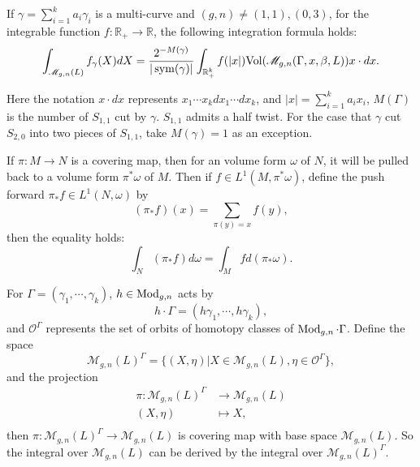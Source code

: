  
 \begin{theorem}\label{integrformu}
 If  $\gamma=\sum_{i=1}^ka_i\gamma_i$ is a multi-curve  and  $(g,n)\neq (1,1),(0,3)$,   for the integrable function $f:\mathbb{R}_+\to \mathbb{R}$, the following integration formula holds:
 $$
 \int_{\mathscr{M}_{g,n}(L)}f_\gamma(X)dX=\frac{2^{-M(\gamma)}}{|\operatorname{sym}(\gamma)|}\int_{\mathbb{R}_+^k}f(|x|)\mathrm{Vol}(\mathscr{M}_{g,n}(\Gamma,x,\beta,L))x\cdot dx.
 $$
 
 Here  the notation $x\cdot dx$ represents $x_1\cdots x_k dx_1\cdots dx_k$, and  $|x|=\sum_{i=1}^k a_ix_i$,
 $M(\Gamma)$  is the number of $S_{1,1}$ cut by $\gamma$. $S_{1,1}$ admits a half twist. For the case that $\gamma$ cut $S_{2,0}$ into two pieces of $S_{1,1}$, take $M(\gamma)=1$ as an exception.
 \end{theorem}
 
 
\begin{lemma}\label{coverintegral}
 If $\pi:M\to N$ is a covering map, then for an volume form $\omega$ of $N$, it will be pulled back to a volume form $\pi^*\omega$ of $M$. 
 Then if $f\in L^1(M,\pi^*\omega)$, define the push forward $\pi_*f\in L^1(N,\omega)$ by 
 \begin{equation}
      (\pi_*f)(x)=\sum_{\pi(y)=x}f(y),
 \end{equation}
 then the equality holds:
 \begin{equation}
     \int_{N} (\pi_*f)d\omega=\int_{M}fd(\pi_*\omega).
 \end{equation}
\end{lemma}
 
 
 For  $\Gamma=(\gamma_1,\cdots,\gamma_k)$,  $h\in \operatorname{Mod}_{g,n}$ acts by
 $$
 h\cdot \Gamma=(h\gamma_1,\cdots,h\gamma_k),
 $$
 and $\mathscr{O}^\Gamma$ represents the set of  orbits of homotopy classes of  $\operatorname{Mod}_{g,n}\cdot \Gamma$. 
 Define the space $$
 \mathscr{M}_{g,n}(L)^\Gamma=\{(X,\eta)|X\in \mathscr{M}_{g,n}(L),\eta\in \mathscr{O}^\Gamma\},
 $$
 and the projection $$
\begin{aligned}
 \pi: \mathscr{M}_{g,n}(L)^\Gamma&\to  \mathscr{M}_{g,n}(L)\\
 (X,\eta)&\mapsto X,\\
\end{aligned}
 $$
 then $\pi\colon \mathscr{M}_{g,n}(L)^\Gamma\to  \mathscr{M}_{g,n}(L)$ is covering map with base space $\mathscr{M}_{g,n}(L)$. So the integral over $\mathscr{M}_{g,n}(L)$ can be derived by the integral over $\mathscr{M}_{g,n}(L)^\Gamma$.
 
